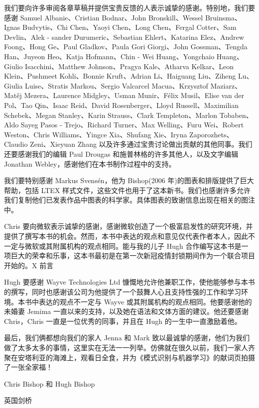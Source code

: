 \documentclass[10pt]{article}
\begin{document}
我们要向许多审阅各章草稿并提供宝贵反馈的人表示诚挚的感谢。特别地，我们要感谢 Samuel Albanie、Cristian Bodnar、John Bronskill、Wessel Bruinsma、Ignas Budvytis、Chi Chen、Yaoyi Chen、Long Chen、Fergal Cotter、Sam Devlin、Alek - sander Durumeric、Sebastian Ehlert、Katarina Elez、Andrew Foong、Hong Ge、Paul Gladkov、Paula Gori Giorgi、John Gossman、Tengda Han、Juyeon Heo、Katja Hofmann、Chin - Wei Huang、Yongchaio Huang、Giulio Isacchini、Matthew Johnson、Pragya Kale、Atharva Kelkar、Leon Klein、Pushmeet Kohli、Bonnie Kruft、Adrian Li、Haiguang Liu、Ziheng Lu、Giulia Luise、Stratis Markou、Sergio Valcarcel Macua、Krzysztof Maziarz、Matěj Mezera、Laurence Midgley、Usman Munir、Félix Musil、Elise van der Pol、Tao Qin、Isaac Reid、David Rosenberger、Lloyd Russell、Maximilian Schebek、Megan Stanley、Karin Strauss、Clark Templeton、Marlon Tobaben、Aldo Sayeg Pasos - Trejo、Richard Turner、Max Welling、Furu Wei、Robert Weston、Chris Williams、Yingce Xia、Shufang Xie、Iryna Zaporozhets、Claudio Zeni、Xieyuan Zhang 以及许多通过宝贵讨论做出贡献的其他同事。我们还要感谢我们的编辑 Paul Drougas 和施普林格的许多其他人，以及文字编辑 Jonathan Webley，感谢他们在本书制作过程中的支持。

我们要特别感谢 Markus Svensén，他为 Bishop(2006 年)的图表和排版提供了巨大帮助，包括 LTEX 样式文件，这些文件也用于了这本新书。我们也感谢许多允许我们复制他们已发表作品中图表的科学家。具体图表的致谢信息出现在相关的图注中。

Chris 要向微软表示诚挚的感谢，感谢微软创造了一个极富启发性的研究环境，并提供了撰写本书的机会。然而，本书中表达的观点和意见仅代表作者本人，因此不一定与微软或其附属机构的观点相同。能与我的儿子 Hugh 合作编写这本书是一项巨大的荣幸和乐事，这本书最初是在第一次新冠疫情封锁期间作为一个联合项目开始的。X 前言

Hugh 要感谢 Wayve Technologies Ltd 慷慨地允许他兼职工作，使他能够参与本书的撰写，同时也感谢该公司为他提供了一个鼓舞人心且支持性强的工作和学习环境。本书中表达的观点不一定与 Wayve 或其附属机构的观点相同。他要感谢他的未婚妻 Jemima 一直以来的支持，以及她在语法和文体方面的建议。他还要感谢 Chris，Chris 一直是一位优秀的同事，并且在 Hugh 的一生中一直激励着他。

最后，我们俩都想向我们的家人 Jenna 和 Mark 致以最诚挚的感谢，他们为我们做了太多太多的事情，这里实在无法一一列举。仿佛就在很久以前，我们一家人齐聚在安塔利亚的海滩上，观看日全食，并为《模式识别与机器学习》的献词页拍摄了一张全家福！

Chris Bishop 和 Hugh Bishop

英国剑桥
\end{document}
